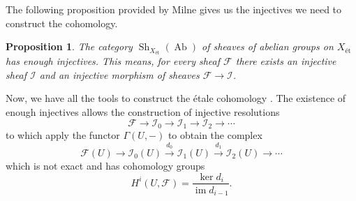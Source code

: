 \documentclass{report}
\DeclareMathOperator{\Sh}{Sh}
\DeclareMathOperator{\im}{im}
\DeclareMathOperator{\Ab}{Ab}
\newtheorem{proposition}[equation]{Proposition}
\theoremstyle{definition}
\begin{document}
The following proposition provided by Milne \cite[Proposition~I.8.12]{milne2013lectures} gives us the injectives we need to construct the cohomology.

\begin{proposition}
The category $\Sh_{X_{\text{\'{e}t}}}(\Ab)$ of sheaves of abelian groups on $X_{\text{\'{e}t}}$ has enough injectives. This means, for every sheaf $\mathcal{F}$ there exists an injective sheaf $\mathcal{I}$ and an injective morphism of sheaves $\mathcal{F}\rightarrow\mathcal{I}$.
\end{proposition}

Now, we have all the tools to construct the \'{e}tale cohomology \cite[Section~I.9]{milne2013lectures}. The existence of enough injectives allows the construction of injective resolutions
\[\mathcal{F}\longrightarrow\mathcal{I}_0\longrightarrow\mathcal{I}_1\longrightarrow\mathcal{I}_2\longrightarrow\cdots\]
to which apply the functor $\Gamma(U,-)$ to obtain the complex
\[\mathcal{F}(U)\longrightarrow\mathcal{I}_0(U)\overset{d_0}{\longrightarrow}\mathcal{I}_1(U)\overset{d_1}{\longrightarrow}\mathcal{I}_2(U)\longrightarrow\cdots\]
which is not exact and has cohomology groups
\[H^i(U,\mathcal{F})=\frac{\ker d_i}{\im d_{i-1}}.\]
\end{document}
